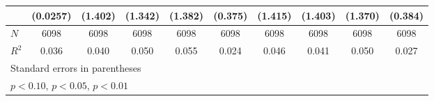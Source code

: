 \begin{table}[htbp]
\begin{tabular}{l*{9}{c}}
            &    (0.0257)         &     (1.402)         &     (1.342)         &     (1.382)         &     (0.375)         &     (1.415)         &     (1.403)         &     (1.370)         &     (0.384)         \\
\hline
\(N\)       &        6098         &        6098         &        6098         &        6098         &        6098         &        6098         &        6098         &        6098         &        6098         \\
\(R^{2}\)   &       0.036         &       0.040         &       0.050         &       0.055         &       0.024         &       0.046         &       0.041         &       0.050         &       0.027         \\
\hline\hline
\multicolumn{10}{l}{\footnotesize Standard errors in parentheses}\\
\multicolumn{10}{l}{\footnotesize \sym{*} \(p<0.10\), \sym{**} \(p<0.05\), \sym{***} \(p<0.01\)}\\
\end{tabular}
\end{table}
